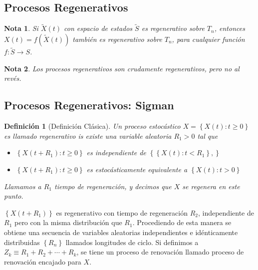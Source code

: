 \documentclass{article}
\newtheorem{Def}{Definición}
\newtheorem{Note}{Nota}
\begin{document}
\subsection{Procesos Regenerativos}



\begin{Note}
Si $\tilde{X}\left(t\right)$ con espacio de estados $\tilde{S}$ es regenerativo sobre $T_{n}$, entonces $X\left(t\right)=f\left(\tilde{X}\left(t\right)\right)$ tambi\'en es regenerativo sobre $T_{n}$, para cualquier funci\'on $f:\tilde{S}\rightarrow S$.
\end{Note}

\begin{Note}
Los procesos regenerativos son crudamente regenerativos, pero no al rev\'es.
\end{Note}

\subsection*{Procesos Regenerativos: Sigman\cite{Sigman1}}
\begin{Def}[Definici\'on Cl\'asica]
Un proceso estoc\'astico $X=\left\{X\left(t\right):t\geq0\right\}$ es llamado regenerativo is existe una variable aleatoria $R_{1}>0$ tal que
\begin{itemize}
\item[i)] $\left\{X\left(t+R_{1}\right):t\geq0\right\}$ es independiente de $\left\{\left\{X\left(t\right):t<R_{1}\right\},\right\}$
\item[ii)] $\left\{X\left(t+R_{1}\right):t\geq0\right\}$ es estoc\'asticamente equivalente a $\left\{X\left(t\right):t>0\right\}$
\end{itemize}

Llamamos a $R_{1}$ tiempo de regeneraci\'on, y decimos que $X$ se regenera en este punto.
\end{Def}

$\left\{X\left(t+R_{1}\right)\right\}$ es regenerativo con tiempo de regeneraci\'on $R_{2}$, independiente de $R_{1}$ pero con la misma distribuci\'on que $R_{1}$. Procediendo de esta manera se obtiene una secuencia de variables aleatorias independientes e id\'enticamente distribuidas $\left\{R_{n}\right\}$ llamados longitudes de ciclo. Si definimos a $Z_{k}\equiv R_{1}+R_{2}+\cdots+R_{k}$, se tiene un proceso de renovaci\'on llamado proceso de renovaci\'on encajado para $X$.
\end{document}
